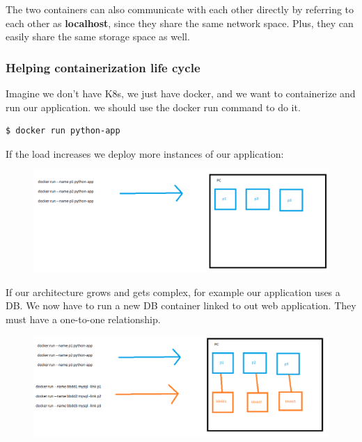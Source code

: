 \documentclass{article}
\newenvironment{blocktemplateII}[1]{%
    \tcolorbox[beamer,%
    noparskip,breakable,
    colframe=Green,%
    colbacklower=LimeGreen!75!LightGreen,%
    title=#1]}%
    {\endtcolorbox}
\newenvironment{codetemplate}[1][]{%
  \mybasecolorbox[#1]
  \itshape
}{%
  \endmybasecolorbox
}
\begin{document}
\begin{blocktemplateII}{Note}
The two containers can also communicate with each other directly by referring to each other as \textbf{localhost}, since they share the same network space. Plus, they can easily share the same storage space as well.    
\end{blocktemplateII}

\subsubsection{Helping containerization life cycle}

Imagine we don't have K8s, we just have docker, and we want to containerize and run our application. we should use the docker run command to do it.

\begin{codetemplate}{}
\begin{verbatim}
$ docker run python-app
\end{verbatim}
\end{codetemplate}


If the load increases we deploy more instances of our application:

\begin{figure}[H]
    \centering
    \includegraphics[scale=0.4]{pictures/image4.png}
\end{figure}

If our architecture grows and gets complex, for example our application uses a DB. We now have to run a new DB container linked to out web application. They must have a one-to-one relationship.

\begin{figure}[H]
    \centering
    \includegraphics[scale=0.55]{pictures/image5.png}
\end{figure}
\end{document}
